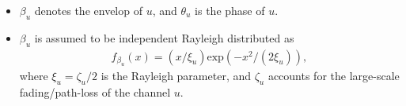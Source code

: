 \documentclass[article,mathserif,10pt,envcountsect]{beamer}
\newcommand{\Exp}[1]{\mathrm{exp}\left(#1\right)}
\begin{document}
\begin{frame}
\begin{minipage}[t]{0.5\linewidth}
	\begin{itemize}
		\item $\beta_u$ denotes the envelop of $u$, and $\theta_{u}$ is the phase of $u$.
		
		\item $\beta_u$ is assumed to be independent Rayleigh distributed as  
		\begin{eqnarray}\label{eqn:chnl_pdf}
		f_{\beta_u}(x) = \left({x}/{\xi_u}\right) \Exp{{- x^2}/\left({2\xi_u}\right)}, \nonumber
		\end{eqnarray}
		where $\xi_u=\zeta_u/2$ is the Rayleigh parameter, and $\zeta_u$ accounts for the large-scale fading/path-loss of the channel $u$.

	\end{itemize}
	
	
\end{minipage}\hspace{-0.5cm}

\end{frame}
\end{document}
